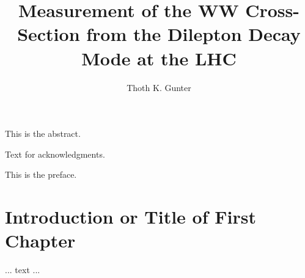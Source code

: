 \documentclass[12pt]{nuthesis}	%
\author{Thoth K. Gunter}
\title{Measurement of the WW Cross-Section from the Dilepton Decay Mode at the LHC}
\begin{document}
%	
%


\frontmatter		%

\maketitle		%

\copyrightpage		%


\abstract		%

This is the abstract.

\acknowledgements	%

Text for acknowledgments.

\preface		%

This is the preface.


%
%
%
%
%
%
%
%

\clearpage{} %
\tableofcontents	%

\clearpage{} %
\listoftables		%

\clearpage{} %
\listoffigures		%



\mainmatter             %



\chapter{Introduction or Title of First Chapter}	%
	... text ...		%
\end{document}
